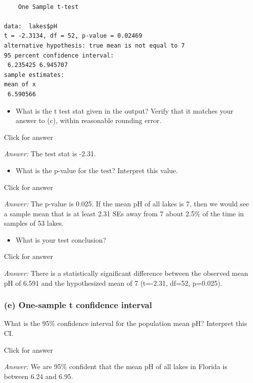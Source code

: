\documentclass[
]{book}
\providecommand{\tightlist}{%
  \setlength{\itemsep}{0pt}\setlength{\parskip}{0pt}}
\begin{document}
\begin{verbatim}

    One Sample t-test

data:  lakes$pH
t = -2.3134, df = 52, p-value = 0.02469
alternative hypothesis: true mean is not equal to 7
95 percent confidence interval:
 6.235425 6.945707
sample estimates:
mean of x 
 6.590566 
\end{verbatim}

\begin{itemize}
\tightlist
\item
  What is the t test stat given in the output? Verify that it matches your answer to (c), within reasonable rounding error.
\end{itemize}

Click for answer

\emph{Answer:} The test stat is -2.31.

\begin{itemize}
\tightlist
\item
  What is the p-value for the test? Interpret this value.
\end{itemize}

Click for answer

\emph{Answer:} The p-value is 0.025. If the mean pH of all lakes is 7, then we would see a sample mean that is at least 2.31 SEs away from 7 about 2.5\% of the time in samples of 53 lakes.

\begin{itemize}
\tightlist
\item
  What is your test conclusion?
\end{itemize}

Click for answer

\emph{Answer:} There is a statistically significant difference between the observed mean pH of 6.591 and the hypothesized mean of 7 (t=-2.31, df=52, p=0.025).

\hypertarget{e-one-sample-t-confidence-interval-1}{%
\subsubsection{(e) One-sample t confidence interval}\label{e-one-sample-t-confidence-interval-1}}

What is the 95\% confidence interval for the population mean pH? Interpret this CI.

Click for answer

\emph{Answer:} We are 95\% confident that the mean pH of all lakes in Florida is between 6.24 and 6.95.
\end{document}
